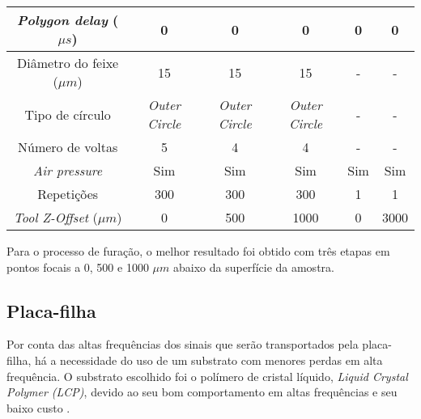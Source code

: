 \begin{table}[htbp]
\begin{tabular}{c|ccc|c|c|}
\multicolumn{1}{|c|}{\textit{Polygon delay} ($\mu s$)}   & \multicolumn{1}{c|}{0}            & \multicolumn{1}{c|}{0}            & 0            & 0                       & 0                     \\ \hline
\multicolumn{1}{|c|}{Diâmetro do feixe ($\mu m$)}   & \multicolumn{1}{c|}{15}           & \multicolumn{1}{c|}{15}           & 15           & -                       & -                     \\ \hline
\multicolumn{1}{|c|}{Tipo de círculo}         & \multicolumn{1}{c|}{\textit{Outer Circle}} & \multicolumn{1}{c|}{\textit{Outer Circle}} & \textit{Outer Circle} & -                       & -                     \\ \hline
\multicolumn{1}{|c|}{Número de voltas}          & \multicolumn{1}{c|}{5}            & \multicolumn{1}{c|}{4}            & 4            & -                       & -                     \\ \hline
\multicolumn{1}{|c|}{\textit{Air pressure}}         & \multicolumn{1}{c|}{Sim}          & \multicolumn{1}{c|}{Sim}          & Sim          & Sim                     & Sim                   \\ \hline
\multicolumn{1}{|c|}{Repetições}           & \multicolumn{1}{c|}{300}          & \multicolumn{1}{c|}{300}          & 300          & 1                       & 1                     \\ \hline
\multicolumn{1}{|c|}{\textit{Tool Z-Offset} ($\mu m$)}   & \multicolumn{1}{c|}{0}            & \multicolumn{1}{c|}{500}          & 1000         & 0                       & 3000                  \\ \hline
\end{tabular}
\centering
\end{table}

Para o processo de furação, o melhor resultado foi obtido com três etapas em pontos focais a 0, 500 e 1000 $\mu m$ abaixo da superfície da amostra.

\subsection{Placa-filha}

Por conta das altas frequências dos sinais que serão transportados pela placa-filha, há a necessidade do uso de um substrato com menores perdas em alta frequência. O substrato escolhido foi o polímero de cristal líquido, \textit{Liquid Crystal Polymer (LCP)}, devido ao seu bom comportamento em altas frequências e seu baixo custo \cite{1395844}.


